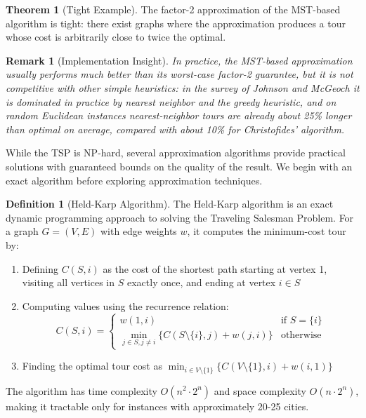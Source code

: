 \documentclass{article}
\newtheorem{remark}{Remark}
\theoremstyle{definition}
\newtheorem{theorem}{Theorem}
\newtheorem{definition}{Definition}
\begin{document}
\begin{theorem}[Tight Example]
The factor-2 approximation of the MST-based algorithm is tight: there exist graphs where the approximation produces a tour whose cost is arbitrarily close to twice the optimal.
\end{theorem}

\begin{remark}[Implementation Insight]
In practice, the MST-based approximation usually performs much better than its worst-case factor-2 guarantee, but it is not competitive with other simple heuristics: in the survey of Johnson and McGeoch it is dominated in practice by nearest neighbor and the greedy heuristic, and on random Euclidean instances nearest-neighbor tours are already about 25\% longer than optimal on average, compared with about 10\% for Christofides' algorithm.
\end{remark}


While the TSP is NP-hard, several approximation algorithms provide practical solutions with guaranteed bounds on the quality of the result. We begin with an exact algorithm before exploring approximation techniques.

\begin{definition}[Held-Karp Algorithm]
The Held-Karp algorithm is an exact dynamic programming approach to solving the Traveling Salesman Problem. For a graph $G = (V, E)$ with edge weights $w$, it computes the minimum-cost tour by:
\begin{enumerate}
    \item Defining $C(S, i)$ as the cost of the shortest path starting at vertex 1, visiting all vertices in $S$ exactly once, and ending at vertex $i \in S$
    \item Computing values using the recurrence relation:
    \begin{equation}
        C(S, i) = 
        \begin{cases}
            w(1,i) & \text{if } S = \{i\} \\
            \min_{j \in S, j \neq i} \{C(S \setminus \{i\}, j) + w(j,i)\} & \text{otherwise}
        \end{cases}
    \end{equation}
    \item Finding the optimal tour cost as $\min_{i \in V \setminus \{1\}} \{C(V \setminus \{1\}, i) + w(i,1)\}$
\end{enumerate}
The algorithm has time complexity $O(n^2 \cdot 2^n)$ and space complexity $O(n \cdot 2^n)$, making it tractable only for instances with approximately 20-25 cities.
\end{definition}
\end{document}
